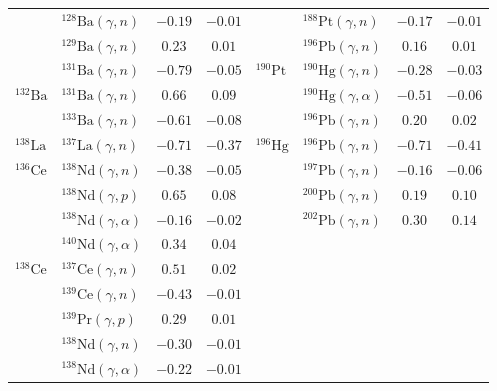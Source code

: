 \begin{table}
\begin{tabular}{llcc|llcc}
    $ $ & $^{128}\mathrm{Ba}(\gamma,n)$ & $-0.19$ & $-0.01$ & $ $ & $^{188}\mathrm{Pt}(\gamma,n)$ & $-0.17$ & $-0.01$ \\ 
    $ $ & $^{129}\mathrm{Ba}(\gamma,n)$ & $0.23$ & $0.01$ & $ $ & $^{196}\mathrm{Pb}(\gamma,n)$ & $0.16$ & $0.01$ \\ 
    $ $ & $^{131}\mathrm{Ba}(\gamma,n)$ & $-0.79$ & $-0.05$ & $^{190}\mathrm{Pt}$ & $^{190}\mathrm{Hg}(\gamma,n)$ & $-0.28$ & $-0.03$ \\ 
    $^{132}\mathrm{Ba}$ & $^{131}\mathrm{Ba}(\gamma,n)$ & $0.66$ & $0.09$ & $ $ & $^{190}\mathrm{Hg}(\gamma,\alpha)$ & $-0.51$ & $-0.06$ \\ 
    $ $ & $^{133}\mathrm{Ba}(\gamma,n)$ & $-0.61$ & $-0.08$ & $ $ & $^{196}\mathrm{Pb}(\gamma,n)$ & $0.20$ & $0.02$ \\ 
    $^{138}\mathrm{La}$ & $^{137}\mathrm{La}(\gamma,n)$ & $-0.71$ & $-0.37$ & $^{196}\mathrm{Hg}$ & $^{196}\mathrm{Pb}(\gamma,n)$ & $-0.71$ & $-0.41$ \\ 
    $^{136}\mathrm{Ce}$ & $^{138}\mathrm{Nd}(\gamma,n)$ & $-0.38$ & $-0.05$ & $ $ & $^{197}\mathrm{Pb}(\gamma,n)$ & $-0.16$ & $-0.06$ \\ 
    $ $ & $^{138}\mathrm{Nd}(\gamma,p)$ & $0.65$ & $0.08$ & $ $ & $^{200}\mathrm{Pb}(\gamma,n)$ & $0.19$ & $0.10$ \\ 
    $ $ & $^{138}\mathrm{Nd}(\gamma,\alpha)$ & $-0.16$ & $-0.02$ & $ $ & $^{202}\mathrm{Pb}(\gamma,n)$ & $0.30$ & $0.14$ \\ 
    $ $ & $^{140}\mathrm{Nd}(\gamma,\alpha)$ & $0.34$ & $0.04$ & $ $ & $ $ &  &  \\ 
    $^{138}\mathrm{Ce}$ & $^{137}\mathrm{Ce}(\gamma,n)$ & $0.51$ & $0.02$ & $ $ & $ $ &  &  \\ 
    $ $ & $^{139}\mathrm{Ce}(\gamma,n)$ & $-0.43$ & $-0.01$ & $ $ & $ $ &  &  \\ 
    $ $ & $^{139}\mathrm{Pr}(\gamma,p)$ & $0.29$ & $0.01$ & $ $ & $ $ &  &  \\ 
    $ $ & $^{138}\mathrm{Nd}(\gamma,n)$ & $-0.30$ & $-0.01$ & $ $ & $ $ &  &  \\ 
    $ $ & $^{138}\mathrm{Nd}(\gamma,\alpha)$ & $-0.22$ & $-0.01$ & $ $ & $ $ &  &  \\ 
    \toprule
    \end{tabular}
\end{table}

